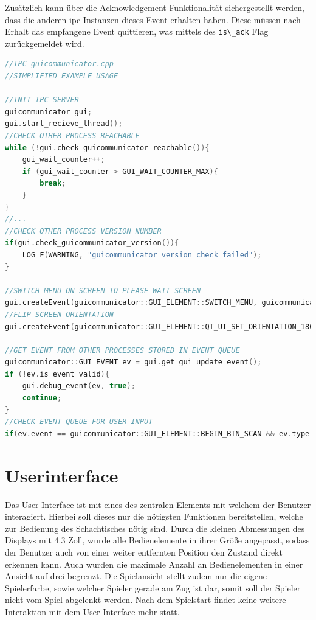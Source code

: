 Zusätzlich kann über die Acknowledgement-Funktionalität sichergestellt
werden, dass die anderen \gls{ipc} Instanzen dieses Event erhalten
haben. Diese müssen nach Erhalt das empfangene Event quittieren, was
mittels des \passthrough{\lstinline!is\_ack!} Flag zurückgemeldet wird.

\begin{lstlisting}[language={C++}]
//IPC guicommunicator.cpp
//SIMPLIFIED EXAMPLE USAGE

//INIT IPC SERVER
guicommunicator gui;
gui.start_recieve_thread();
//CHECK OTHER PROCESS REACHABLE
while (!gui.check_guicommunicator_reachable()){
    gui_wait_counter++;
    if (gui_wait_counter > GUI_WAIT_COUNTER_MAX){
        break;
    }
}
//...
//CHECK OTHER PROCESS VERSION NUMBER
if(gui.check_guicommunicator_version()){
    LOG_F(WARNING, "guicommunicator version check failed");
}

//SWITCH MENU ON SCREEN TO PLEASE WAIT SCREEN
gui.createEvent(guicommunicator::GUI_ELEMENT::SWITCH_MENU, guicommunicator::GUI_VALUE_TYPE::PROCESSING_SCREEN);
//FLIP SCREEN ORIENTATION
gui.createEvent(guicommunicator::GUI_ELEMENT::QT_UI_SET_ORIENTATION_180, guicommunicator::GUI_VALUE_TYPE::ENABLED);

//GET EVENT FROM OTHER PROCESSES STORED IN EVENT QUEUE
guicommunicator::GUI_EVENT ev = gui.get_gui_update_event();
if (!ev.is_event_valid){
    gui.debug_event(ev, true);
    continue;
}
//CHECK EVENT QUEUE FOR USER INPUT
if(ev.event == guicommunicator::GUI_ELEMENT::BEGIN_BTN_SCAN && ev.type == guicommunicator::GUI_VALUE_TYPE::CLICKED) {}
\end{lstlisting}

\hypertarget{userinterface}{%
\section{Userinterface}\label{userinterface}}

Das User-Interface ist mit eines des zentralen Elements mit welchem der
Benutzer interagiert. Hierbei soll dieses nur die nötigsten Funktionen
bereitstellen, welche zur Bedienung des Schachtisches nötig sind. Durch
die kleinen Abmessungen des Displays mit 4.3 Zoll, wurde alle
Bedienelemente in ihrer Größe angepasst, sodass der Benutzer auch von
einer weiter entfernten Position den Zustand direkt erkennen kann. Auch
wurden die maximale Anzahl an Bedienelementen in einer Ansicht auf drei
begrenzt. Die Spielansicht stellt zudem nur die eigene Spielerfarbe,
sowie welcher Spieler gerade am Zug ist dar, somit soll der Spieler
nicht vom Spiel abgelenkt werden. Nach dem Spielstart findet keine
weitere Interaktion mit dem User-Interface mehr statt.

